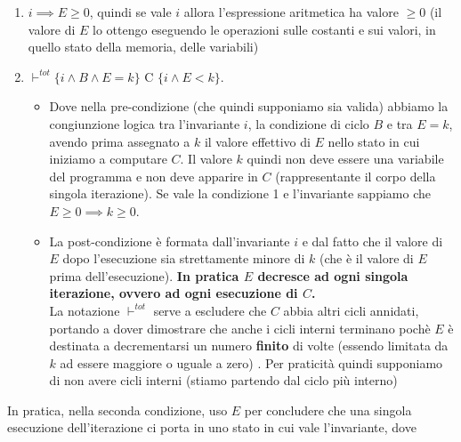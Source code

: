 				      				\begin{enumerate}
				      					\item $i\implies E\geq 0$, quindi se vale $i$ allora l'espressione aritmetica
				      					      ha valore $\geq 0$ (il valore di $E$ lo ottengo eseguendo le operazioni sulle
				      					      costanti e sui valori, in quello stato della memoria, delle variabili)
				      					      \label{ConditionTotalCorrectness1}
				      					\item $\vdash^{tot}\{i\land B\land E=k\}\mbox{ C }\{i\land E<k\}$.
				      					\begin{itemize}
				      					    \item Dove
				      					      nella pre-condizione (che quindi supponiamo sia valida) abbiamo la congiunzione logica tra l'invariante $i$, la
				      					      condizione di ciclo $B$ e tra $E=k$, avendo prima assegnato a $k$ il valore
				      					      effettivo di $E$ nello stato in cui iniziamo a computare $C$. Il valore $k$ quindi non
				      					      deve essere una variabile del programma e non deve apparire in $C$
				      					      (rappresentante il corpo della singola iterazione). Se vale la
				      					      condizione 1 e l'invariante sappiamo che $E\geq 0\implies k\geq 0$. 
				      					      \item La
				      					      post-condizione è formata dall'invariante $i$ e dal fatto che il valore di $E$
				      					      dopo l'esecuzione sia strettamente minore di $k$ (che è il valore di $E$ prima
				      					      dell'esecuzione). \textbf{In pratica $E$ decresce ad ogni singola iterazione, ovvero
				      					      	ad ogni esecuzione di $C$.}\\
				      					      La notazione $\vdash^{tot}$ serve a escludere che $C$ abbia altri cicli
				      					      annidati, portando a dover dimostrare che anche i cicli interni
				      					      terminano pochè $E$ è destinata a decrementarsi un numero \textbf{finito} di volte (essendo limitata da $k$ ad essere maggiore o uguale a zero) . Per praticità quindi supponiamo di non avere cicli interni (stiamo
				      					      partendo dal ciclo più interno)
				      					\end{itemize}
				      		
				      					      \label{ConditionTotalCorrectness2}
				      				\end{enumerate}
				      				In pratica, nella seconda condizione, uso $E$ per concludere che una singola
				      				esecuzione dell'iterazione ci porta in uno stato in cui vale l'invariante, dove
